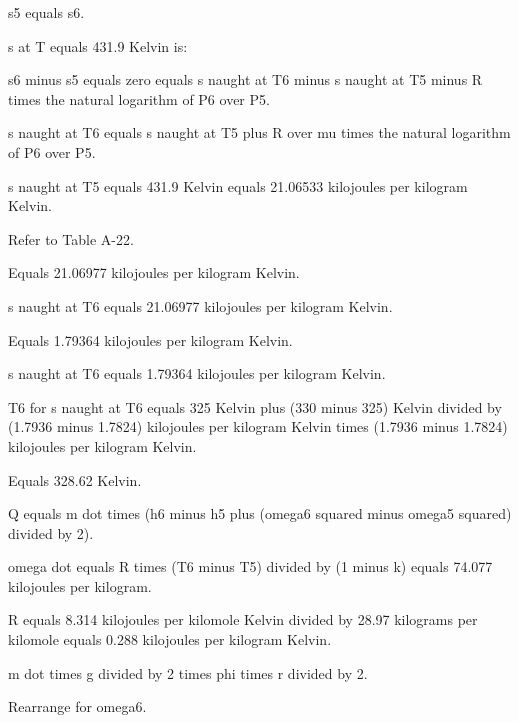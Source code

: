 s5 equals s6.

s at T equals 431.9 Kelvin is:

s6 minus s5 equals zero equals s naught at T6 minus s naught at T5 minus R times the natural logarithm of P6 over P5.

s naught at T6 equals s naught at T5 plus R over mu times the natural logarithm of P6 over P5.

s naught at T5 equals 431.9 Kelvin equals 21.06533 kilojoules per kilogram Kelvin.

Refer to Table A-22.

Equals 21.06977 kilojoules per kilogram Kelvin.

s naught at T6 equals 21.06977 kilojoules per kilogram Kelvin.

Equals 1.79364 kilojoules per kilogram Kelvin.

s naught at T6 equals 1.79364 kilojoules per kilogram Kelvin.

T6 for s naught at T6 equals 325 Kelvin plus (330 minus 325) Kelvin divided by (1.7936 minus 1.7824) kilojoules per kilogram Kelvin times (1.7936 minus 1.7824) kilojoules per kilogram Kelvin.

Equals 328.62 Kelvin.

Q equals m dot times (h6 minus h5 plus (omega6 squared minus omega5 squared) divided by 2).

omega dot equals R times (T6 minus T5) divided by (1 minus k) equals 74.077 kilojoules per kilogram.

R equals 8.314 kilojoules per kilomole Kelvin divided by 28.97 kilograms per kilomole equals 0.288 kilojoules per kilogram Kelvin.

m dot times g divided by 2 times phi times r divided by 2.

Rearrange for omega6.